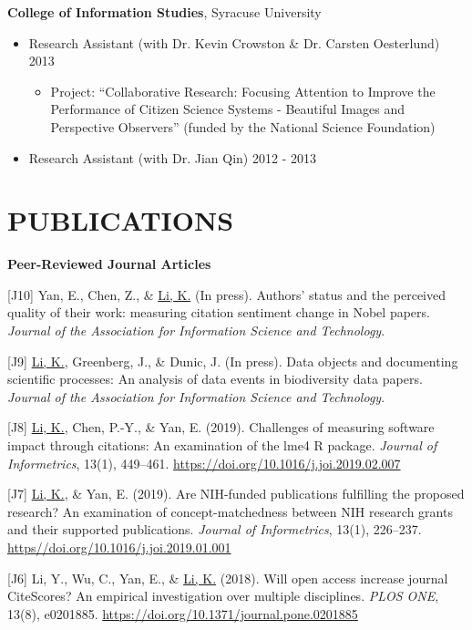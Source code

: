 \documentclass[margin, 10pt]{res} %
\begin{document}
\begin{resume}
\textbf{College of Information Studies}, Syracuse University\\
\begin{itemize}
	\item Research Assistant (with Dr. Kevin Crowston \& Dr. Carsten Oesterlund) \hfill 2013
    \begin{itemize}
     	\item Project: “Collaborative Research: Focusing Attention to Improve the Performance of Citizen Science Systems - Beautiful Images and Perspective Observers” (funded by the National Science Foundation)
    \end{itemize}
    \item Research Assistant (with Dr. Jian Qin) \hfill 2012 - 2013
\end{itemize}

\section{PUBLICATIONS}

\textbf{Peer-Reviewed Journal Articles}

[J10] Yan, E., Chen, Z., \& \underline{Li, K.} (In press). Authors’ status and the perceived quality of their work: measuring citation sentiment change in Nobel papers. \textit{Journal of the Association for Information Science and Technology}.

[J9] \underline{Li, K.}, Greenberg, J., \& Dunic, J. (In press). Data objects and documenting scientific processes: An analysis of data events in biodiversity data papers. \textit{Journal of the Association for Information Science and Technology}.

[J8] \underline{Li, K.}, Chen, P.-Y., \& Yan, E. (2019). Challenges of measuring software impact through citations: An examination of the lme4 R package. \textit{Journal of Informetrics}, 13(1), 449–461. \href{https://doi.org/10.1016/j.joi.2019.02.007}{https://doi.org/10.1016/j.joi.2019.02.007}

[J7] \underline{Li, K.}, \& Yan, E. (2019). Are NIH-funded publications fulfilling the proposed research? An examination of concept-matchedness between NIH research grants and their supported publications. \textit{Journal of Informetrics}, 13(1), 226–237. \href{https//doi.org/10.1016/j.joi.2019.01.001}{https//doi.org/10.1016/j.joi.2019.01.001}

[J6] Li, Y., Wu, C., Yan, E., \& \underline{Li, K.} (2018). Will open access increase journal CiteScores? An empirical investigation over multiple disciplines. \textit{PLOS ONE}, 13(8), e0201885. \href{https://doi.org/10.1371/journal.pone.0201885}{https://doi.org/10.1371/journal.pone.0201885}


\end{resume}
\end{document}
